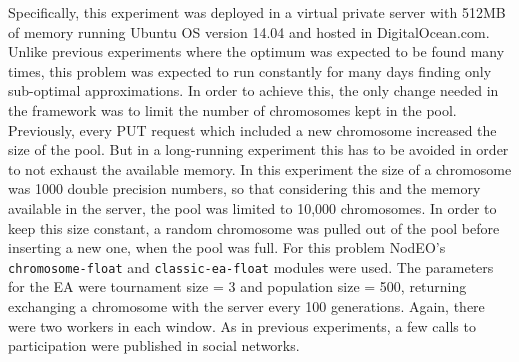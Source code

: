 \documentclass[journal,onecolumn]{IEEEtran}
\begin{document}
Specifically, this experiment was deployed in a virtual private server with 512MB of memory
running Ubuntu OS version 14.04 and hosted in DigitalOcean.com. Unlike previous
experiments where the optimum was expected to be found many times, 
this problem was expected to run constantly for many days finding only
sub-optimal approximations. In order to achieve this, the only change needed 
in the framework was to limit the number of chromosomes kept in the pool. 
Previously, every PUT request which included a new chromosome increased 
the size of the pool. But in a long-running experiment this has to be avoided
in order to not exhaust the available memory. In this experiment the size
of a chromosome was 1000 double precision numbers, so that considering this
and the memory available in the server, the pool was limited 
to 10,000 chromosomes.  In order to keep this size
constant, a random chromosome was pulled out of the pool before inserting a
new one, when the pool was full. For this problem {\sf NodEO}'s {\tt chromosome-float} 
and {\tt classic-ea-float} modules were used. The parameters for the EA 
were tournament size = 3 and  population size = 500, returning exchanging a
chromosome with the server every 100 generations. Again, there were two workers in each window.
As in previous experiments, a few calls to participation were published in social networks.
\end{document}
